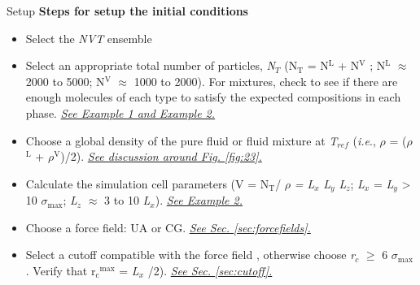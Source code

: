 \documentclass[9pt,bestpractices]{livecoms}
\newcommand{\checkref}[1]{\uline{\emph{{\color{LiveCoMSDarkBlue}#1}}}}
\begin{document}
\begin{Checklists*}[p!]
\begin{checklist}{Setup}
\textbf{Steps for setup the initial conditions}
\begin{itemize}
\item Select the \textit{NVT} ensemble \\
\item Select an appropriate total number of particles, \textit{N}$_{T}$ (N$_{\mathrm{T}}$ = N$^{\mathrm{L}}$ + N$^{\mathrm{V}}$ ; N$^{\mathrm{L}}$ ${\approx}$ 2000 to 5000; N$^{\mathrm{V}}$ ${\approx}$ 1000 to 2000). For mixtures, check to see if there are enough molecules of each type to satisfy the expected compositions in each phase. \checkref{See Example 1 and Example 2.} \\
\item Choose a global density of the pure fluid or fluid mixture at \textit{T}$_{ref}$ (\textit{i.e}., {${\rho}$} = ({${\rho}$}$^{\mathrm{L}}$ + {${\rho}$}$^{\mathrm{V}}$)/2). \checkref{See discussion around Fig. \ref{fig:23}.} \\
\item Calculate the simulation cell parameters (V = N$_{\mathrm{T}}$/ {${\rho}$} \textit{= L}$_{x}$ \textit{L}$_{y}$ \textit{L}$_{z}$; \textit{L}$_{x}$ = \textit{L}$_{y}$ {\textgreater} 10 ${\sigma}$$_{\mathrm{max}}$;  \textit{L}$_{z}$ ${\approx}$ 3 to 10 \textit{L}$_{x}$). \checkref{See Example 2.} \\
\item Choose a force field: UA or CG. \checkref{See Sec. \ref{sec:forcefields}.} \\
\item Select a cutoff compatible with the force field , otherwise choose \textit{r}$_{c}$ ${\geq}$ 6 ${\sigma}$$_{\mathrm{max}}$ . Verify that r$_{\mathrm{c}}$$^{\mathrm{max}}$ = \textit{L}$_{x}$ /2). \checkref{See Sec. \ref{sec:cutoff}.} \\
$$
\end{itemize}
\end{checklist}
\end{Checklists*}
\end{document}
